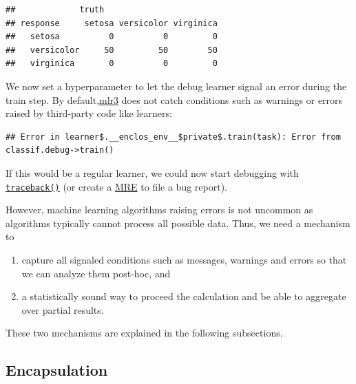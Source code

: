 \documentclass[]{scrbook}
\newenvironment{Shaded}{\begin{snugshade}}{\end{snugshade}}
\newcommand{\DataTypeTok}[1]{\textcolor[rgb]{0.13,0.29,0.53}{#1}}
\newcommand{\DecValTok}[1]{\textcolor[rgb]{0.00,0.00,0.81}{#1}}
\newcommand{\KeywordTok}[1]{\textcolor[rgb]{0.13,0.29,0.53}{\textbf{#1}}}
\newcommand{\NormalTok}[1]{#1}
\newcommand{\OperatorTok}[1]{\textcolor[rgb]{0.81,0.36,0.00}{\textbf{#1}}}
\newcommand{\StringTok}[1]{\textcolor[rgb]{0.31,0.60,0.02}{#1}}
\providecommand{\tightlist}{%
  \setlength{\itemsep}{0pt}\setlength{\parskip}{0pt}}
\renewenvironment{Shaded} {\begin{snugshade}\small} {\end{snugshade}}
\begin{document}
\begin{verbatim}
##             truth
## response     setosa versicolor virginica
##   setosa          0          0         0
##   versicolor     50         50        50
##   virginica       0          0         0
\end{verbatim}

We now set a hyperparameter to let the debug learner signal an error during the train step.
By default,\href{https://github.com/mlr-org/mlr3}{mlr3} does not catch conditions such as warnings or errors raised by third-party code like learners:

\begin{Shaded}
\end{Shaded}

\begin{verbatim}
## Error in learner$.__enclos_env__$private$.train(task): Error from classif.debug->train()
\end{verbatim}

If this would be a regular learner, we could now start debugging with \href{https://www.rdocumentation.org/packages/base/topics/traceback}{\texttt{traceback()}} (or create a \href{https://stackoverflow.com/help/minimal-reproducible-example}{MRE} to file a bug report).

However, machine learning algorithms raising errors is not uncommon as algorithms typically cannot process all possible data.
Thus, we need a mechanism to

\begin{enumerate}
\def\labelenumi{\arabic{enumi}.}
\tightlist
\item
  capture all signaled conditions such as messages, warnings and errors so that we can analyze them post-hoc, and
\item
  a statistically sound way to proceed the calculation and be able to aggregate over partial results.
\end{enumerate}

These two mechanisms are explained in the following subsections.

\hypertarget{encapsulation}{%
\subsection{Encapsulation}\label{encapsulation}}
\end{document}
